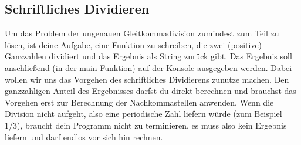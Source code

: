 \subsection{Schriftliches Dividieren }
Um das Problem der ungenauen Gleitkommadivision zumindest zum Teil zu lösen, ist deine Aufgabe, eine Funktion zu schreiben, die zwei (positive) Ganzzahlen dividiert und das Ergebnis als String zurück gibt. Das Ergebnis soll anschließend (in der main-Funktion) auf der Konsole ausgegeben werden. Dabei wollen wir uns das Vorgehen des schriftliches Dividierens zunutze machen. Den ganzzahligen Anteil des Ergebnisses darfst du direkt berechnen und brauchst das Vorgehen erst zur Berechnung der Nachkommastellen anwenden. Wenn die Division nicht aufgeht, also eine periodische Zahl liefern würde (zum Beispiel 1/3), braucht dein Programm nicht zu terminieren, es muss also kein Ergebnis liefern und darf endlos vor sich hin rechnen.
